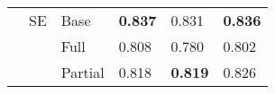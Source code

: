 \begin{table}[!t]
\begin{tabular}{lllT{25mm}T{25mm}T{25mm}}

& SE & Base    & \textbf{0.837} & 0.831          & \textbf{0.836}\\
&    & Full    & 0.808          & 0.780          & 0.802\\
&    & Partial & 0.818          & \textbf{0.819} & 0.826\\

\bottomrule

\end{tabular}
\end{table}
\endgroup
